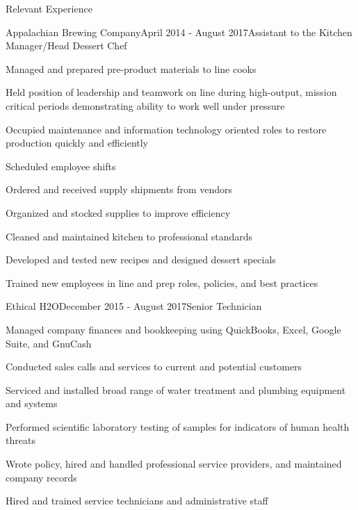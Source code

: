 \documentclass{resume} %
\begin{document}
\begin{rSection}{Relevant Experience}

\begin{rWorkSubsection}{Appalachian Brewing Company}{April 2014 - August 2017}{Assistant to the Kitchen Manager/Head Dessert Chef}{}
\item Managed and prepared pre-product materials to line cooks
\item Held position of leadership and teamwork on line during high-output, mission critical periods demonstrating ability to work well under pressure
\item Occupied maintenance and information technology oriented roles to restore production quickly and efficiently
\item Scheduled employee shifts
\item Ordered and received supply shipments from vendors
\item Organized and stocked supplies to improve efficiency
\item Cleaned and maintained kitchen to professional standards
\item Developed and tested new recipes and designed dessert specials
\item Trained new employees in line and prep roles, policies, and best practices
\end{rWorkSubsection}


\begin{rWorkSubsection}{Ethical H2O}{December 2015 - August 2017}{Senior Technician}{}
\item Managed company finances and bookkeeping using QuickBooks, Excel, Google Suite, and GnuCash
\item Conducted sales calls and services to current and potential customers
\item Serviced and installed broad range of water treatment and plumbing equipment and systems
\item Performed scientific laboratory testing of samples for indicators of human health threats
\item Wrote policy, hired and handled professional service providers, and maintained company records
\item Hired and trained service technicians and administrative staff
\end{rWorkSubsection}



\end{rSection}
\end{document}
